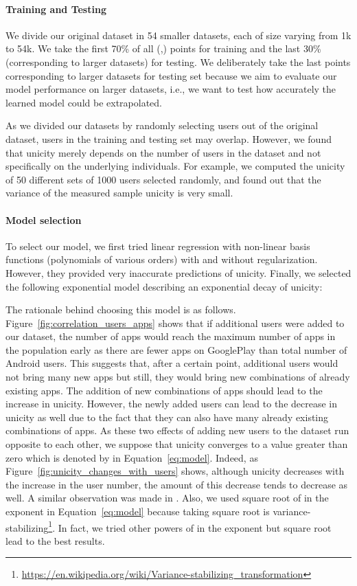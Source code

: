 \documentclass{acm_proc_article-sp}
\theoremstyle{plain}
\theoremstyle{plain}
\theoremstyle{plain}
\theoremstyle{plain}
\theoremstyle{plain}
\theoremstyle{plain}
\begin{document}
\paragraph{Training and Testing}
We divide our original dataset in 54 smaller datasets, each of size varying from 1k to 54k.
We take the first 70\%  of all (,) points for training and the last 30\%  (corresponding to larger datasets) for testing.
We deliberately take the last points corresponding to larger datasets for testing set because we aim to evaluate our model performance on larger datasets, i.e., we want to test how accurately the learned model could be extrapolated.


As we divided our datasets by randomly selecting users out of the original dataset, users in the training and testing set may overlap.
However, we found that unicity merely depends on the number of users in the dataset and not specifically on the underlying individuals.
For example, we computed the unicity of 50 different sets of 1000 users selected randomly, and found out that the variance of the measured sample unicity is very small.







\paragraph{Model selection}

To select our model, we first tried linear regression with non-linear basis functions (polynomials of various orders) with and without regularization.
However, they provided very inaccurate predictions of unicity. Finally, we selected the following exponential model describing an exponential decay of unicity:


The rationale behind choosing this model is as follows. Figure~\ref{fig:correlation_users_apps} shows that if additional users were added to our dataset, the number of apps would reach the maximum number of apps in the population early as there are fewer apps on GooglePlay than total number of Android users.
This suggests that, after a certain point, additional users would not bring many new apps but still, they would bring new combinations of already existing apps.
The addition of new combinations of apps should lead to the increase in unicity. However, the newly added users can lead to the decrease in unicity as well due to the fact that they can also have many already existing combinations of apps.
As these two effects of adding new users to the dataset run opposite to each other, we suppose that unicity converges to a value greater than zero which is denoted by  in Equation~\ref{eq:model}.
Indeed, as Figure~\ref{fig:unicity_changes_with_users} shows, although unicity decreases with the increase in the user number, the amount of this decrease tends to decrease as well.
A similar observation was made in \cite{Nature13}.
Also, we used square root of  in the exponent in Equation~\ref{eq:model} because taking square root is variance-stabilizing\footnote{\url{https://en.wikipedia.org/wiki/Variance-stabilizing_transformation}}.
In fact, we tried other powers of  in the exponent but square root lead to the best results.
\end{document}
